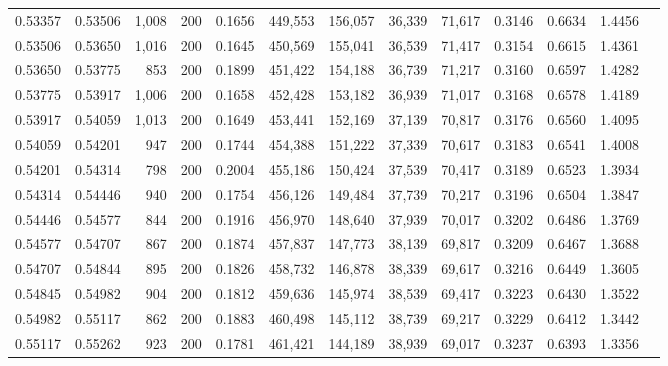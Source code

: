\begin{tabular}{rrrrrrrrrrrrr}
0.53357 & 0.53506 &  1,008 & 200 &                                     0.1656 & 449,553 & 156,057 &  36,339 &  71,617 & 0.3146 & 0.6634 & 1.4456 \\
0.53506 & 0.53650 &  1,016 & 200 &                                     0.1645 & 450,569 & 155,041 &  36,539 &  71,417 & 0.3154 & 0.6615 & 1.4361 \\
0.53650 & 0.53775 &    853 & 200 &                                     0.1899 & 451,422 & 154,188 &  36,739 &  71,217 & 0.3160 & 0.6597 & 1.4282 \\
0.53775 & 0.53917 &  1,006 & 200 &                                     0.1658 & 452,428 & 153,182 &  36,939 &  71,017 & 0.3168 & 0.6578 & 1.4189 \\
0.53917 & 0.54059 &  1,013 & 200 &                                     0.1649 & 453,441 & 152,169 &  37,139 &  70,817 & 0.3176 & 0.6560 & 1.4095 \\
0.54059 & 0.54201 &    947 & 200 &                                     0.1744 & 454,388 & 151,222 &  37,339 &  70,617 & 0.3183 & 0.6541 & 1.4008 \\
0.54201 & 0.54314 &    798 & 200 &                                     0.2004 & 455,186 & 150,424 &  37,539 &  70,417 & 0.3189 & 0.6523 & 1.3934 \\
0.54314 & 0.54446 &    940 & 200 &                                     0.1754 & 456,126 & 149,484 &  37,739 &  70,217 & 0.3196 & 0.6504 & 1.3847 \\
0.54446 & 0.54577 &    844 & 200 &                                     0.1916 & 456,970 & 148,640 &  37,939 &  70,017 & 0.3202 & 0.6486 & 1.3769 \\
0.54577 & 0.54707 &    867 & 200 &                                     0.1874 & 457,837 & 147,773 &  38,139 &  69,817 & 0.3209 & 0.6467 & 1.3688 \\
0.54707 & 0.54844 &    895 & 200 &                                     0.1826 & 458,732 & 146,878 &  38,339 &  69,617 & 0.3216 & 0.6449 & 1.3605 \\
0.54845 & 0.54982 &    904 & 200 &                                     0.1812 & 459,636 & 145,974 &  38,539 &  69,417 & 0.3223 & 0.6430 & 1.3522 \\
0.54982 & 0.55117 &    862 & 200 &                                     0.1883 & 460,498 & 145,112 &  38,739 &  69,217 & 0.3229 & 0.6412 & 1.3442 \\
0.55117 & 0.55262 &    923 & 200 &                                     0.1781 & 461,421 & 144,189 &  38,939 &  69,017 & 0.3237 & 0.6393 & 1.3356 \\

\end{tabular}
